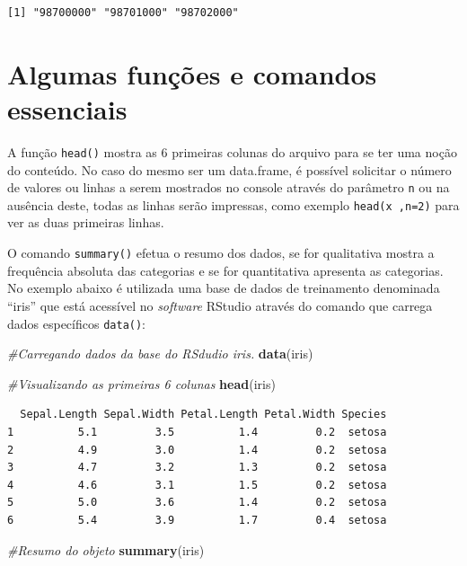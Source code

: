 \documentclass[12pt,brazil,oneside]{book}
\newenvironment{Shaded}{\begin{snugshade}}{\end{snugshade}}
\newcommand{\CommentTok}[1]{\textcolor[rgb]{0.56,0.35,0.01}{\textit{#1}}}
\newcommand{\KeywordTok}[1]{\textcolor[rgb]{0.13,0.29,0.53}{\textbf{#1}}}
\newcommand{\NormalTok}[1]{#1}
\begin{document}
\begin{verbatim}
[1] "98700000" "98701000" "98702000"
\end{verbatim}

\hypertarget{algumas-funcoes-e-comandos-essenciais}{%
\section{Algumas funções e comandos essenciais}\label{algumas-funcoes-e-comandos-essenciais}}

A função \texttt{head()} mostra as 6 primeiras colunas do arquivo para se ter uma noção do conteúdo. No caso do mesmo ser um data.frame, é possível solicitar o número de valores ou linhas a serem mostrados no console através do parâmetro \texttt{n} ou na ausência deste, todas as linhas serão impressas, como exemplo \texttt{head(x\ ,n=2)} para ver as duas primeiras linhas.

O comando \texttt{summary()} efetua o resumo dos dados, se for qualitativa mostra a frequência absoluta das categorias e se for quantitativa apresenta as categorias. No exemplo abaixo é utilizada uma base de dados de treinamento denominada ``iris'' que está acessível no \emph{software} RStudio através do comando que carrega dados específicos \texttt{data()}:

\begin{Shaded}
\begin{Highlighting}[]
\CommentTok{#Carregando dados da base do RSdudio iris.}
\KeywordTok{data}\NormalTok{(iris)}

\CommentTok{#Visualizando as primeiras 6 colunas}
\KeywordTok{head}\NormalTok{(iris)}
\end{Highlighting}
\end{Shaded}

\begin{verbatim}
  Sepal.Length Sepal.Width Petal.Length Petal.Width Species
1          5.1         3.5          1.4         0.2  setosa
2          4.9         3.0          1.4         0.2  setosa
3          4.7         3.2          1.3         0.2  setosa
4          4.6         3.1          1.5         0.2  setosa
5          5.0         3.6          1.4         0.2  setosa
6          5.4         3.9          1.7         0.4  setosa
\end{verbatim}

\begin{Shaded}
\begin{Highlighting}[]
\CommentTok{#Resumo do objeto}
\KeywordTok{summary}\NormalTok{(iris)}
\end{Highlighting}
\end{Shaded}
\end{document}
